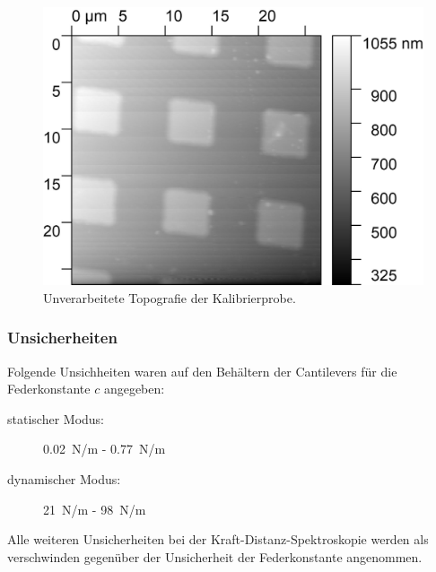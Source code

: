 \documentclass[
	a4paper,
	12pt,
	pagesize,
	ngerman
]{scrartcl}
\begin{document}
	\begin{figure}[H]
			\includegraphics[width=.6\linewidth]{images/Kali/raw}
			\caption{Unverarbeitete Topografie der Kalibrierprobe.}
			\label{fig_kali_raw}
	\end{figure}

\subsubsection{Unsicherheiten}
	Folgende Unsichheiten waren auf den Behältern der Cantilevers für die Federkonstante $c$ angegeben:
	\begin{description}
		\item[statischer Modus:] \SI{0.02}{N/m} - \SI{0.77}{N/m} %
		\item[dynamischer Modus:] \SI{21}{N/m} - \SI{98}{N/m} %
	\end{description}
	Alle weiteren Unsicherheiten bei der Kraft-Distanz-Spektroskopie werden als verschwinden gegenüber der Unsicherheit der Federkonstante angenommen.
\end{document}
